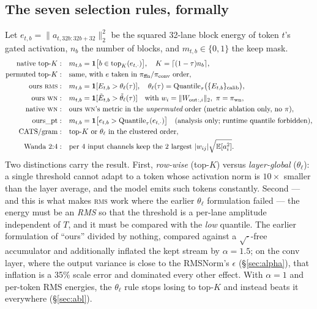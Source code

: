 \documentclass[11pt]{article}
\newcommand{\Wout}{\ensuremath{W_{\mathrm{out}}}}
\newcommand{\pif}{\pi_{\mathrm{ffn}}}
\newcommand{\pic}{\pi_{\mathrm{conv}}}
\newcommand{\thetal}{\theta_\ell}
\newcommand{\rms}{\textsc{rms}}
\newcommand{\wn}{\textsc{wn}}
\newcommand{\piwn}{\pi_{\mathrm{wn}}}
\begin{document}
\subsection{The seven selection rules, formally}
Let $e_{t,b}=\|a_{t,32b:32b+32}\|_2^2$ be the squared 32-lane block energy of token $t$'s
gated activation, $n_b$ the number of blocks, and $m_{t,b}\in\{0,1\}$ the keep mask.
\begin{align}
\text{native top-}K:\quad & m_{t,b}=\mathbf{1}\big[b\in\mathrm{top}_K(e_{t,\cdot})\big],\quad
K=\lceil(1-\tau)n_b\rceil,\\
\text{permuted top-}K:\quad & \text{same, with } e \text{ taken in }\pif/\pic\text{ order},\\
\text{ours \rms}:\quad & m_{t,b}=\mathbf{1}[E_{t,b}>\thetal(\tau)],\quad
\thetal(\tau)=\mathrm{Quantile}_{\tau}\big(\{E_{t,b}\}_{\text{calib}}\big),\\
\text{ours \wn}:\quad & m_{t,b}=\mathbf{1}[\tilde E_{t,b}>\tilde\thetal(\tau)]
\quad\text{with } w_i=\|\Wout{}_{:,i}\|_2,\ \pi=\piwn,\\
\text{native \wn}:\quad & \text{ours \wn's metric in the } \emph{unpermuted} \text{ order
(metric ablation only, no }\pi),\\
\text{ours\_pt}:\quad & m_{t,b}=\mathbf{1}\big[e_{t,b}>\mathrm{Quantile}_{\tau}(e_{t,\cdot})\big]
\quad\text{(analysis only; runtime quantile forbidden)},\\
\text{CATS/gram}:\quad & \text{top-}K \text{ or } \thetal \text{ in the clustered order},\\
\text{Wanda 2:4}:\quad & \text{per 4 input channels keep the 2 largest }
|w_{ij}|\sqrt{\mathbb{E}[a_i^2]}.
\end{align}
Two distinctions carry the result. First, \emph{row-wise} (top-$K$) versus
\emph{layer-global} ($\thetal$): a single threshold cannot adapt to a token whose activation
norm is $10\times$ smaller than the layer average, and the model emits such tokens
constantly. Second --- and this is what makes \rms{} work where the earlier $\thetal$
formulation failed --- the energy must be an \emph{RMS} so that the threshold is a
per-lane amplitude independent of $T$, and it must be compared with the \emph{low}
quantile. The earlier formulation of ``ours'' divided by nothing, compared against a
$\sqrt{\cdot}$-free accumulator and additionally inflated the kept stream by
$\alpha{=}1.5$; on the conv layer, where the output variance is close to the RMSNorm's
$\epsilon$ (\S\ref{sec:alpha}), that inflation is a 35\% scale error and dominated every
other effect. With $\alpha{=}1$ and per-token RMS energies, the $\thetal$ rule stops losing
to top-$K$ and instead beats it everywhere (\S\ref{sec:abl}).
\end{document}

